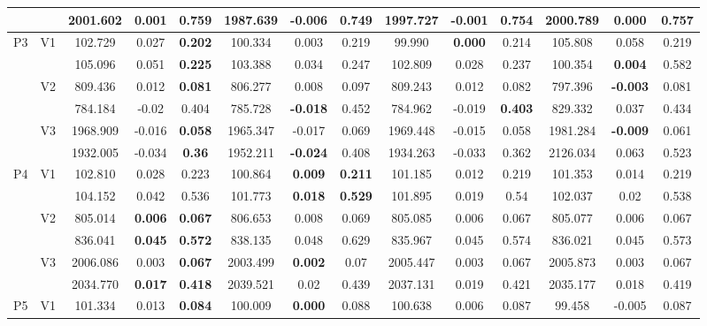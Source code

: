 \documentclass[12pt,a4paper]{article}
\begin{document}
\begin{sidewaystable}[ht]
{\begin{tabular}{cc|ccc|ccc|ccc|ccc|}
   &  & 2001.602 & 0.001 & 0.759 & 1987.639 & -0.006 & \textbf{0.749} & 1997.727 & -0.001 & 0.754 & 2000.789 & \textbf{0.000} & 0.757 \\ 
   \hline \hline\multirow{6}{*}{P3} & \multirow{2}{*}{V1} & 102.729 & 0.027 & \textbf{0.202} & 100.334 & 0.003 & 0.219 & 99.990 & \textbf{0.000} & 0.214 & 105.808 & 0.058 & 0.219 \\ 
   &  & 105.096 & 0.051 & \textbf{0.225} & 103.388 & 0.034 & 0.247 & 102.809 & 0.028 & 0.237 & 100.354 & \textbf{0.004} & 0.582 \\ 
   & \multirow{2}{*}{V2} & 809.436 & 0.012 & \textbf{0.081} & 806.277 & 0.008 & 0.097 & 809.243 & 0.012 & 0.082 & 797.396 & \textbf{-0.003} & 0.081 \\ 
   &  & 784.184 & -0.02 & 0.404 & 785.728 & \textbf{-0.018} & 0.452 & 784.962 & -0.019 & \textbf{0.403} & 829.332 & 0.037 & 0.434 \\ 
   & \multirow{2}{*}{V3} & 1968.909 & -0.016 & \textbf{0.058} & 1965.347 & -0.017 & 0.069 & 1969.448 & -0.015 & 0.058 & 1981.284 & \textbf{-0.009} & 0.061 \\ 
   &  & 1932.005 & -0.034 & \textbf{0.36} & 1952.211 & \textbf{-0.024} & 0.408 & 1934.263 & -0.033 & 0.362 & 2126.034 & 0.063 & 0.523 \\ 
   \hline \hline\multirow{6}{*}{P4} & \multirow{2}{*}{V1} & 102.810 & 0.028 & 0.223 & 100.864 & \textbf{0.009} & \textbf{0.211} & 101.185 & 0.012 & 0.219 & 101.353 & 0.014 & 0.219 \\ 
   &  & 104.152 & 0.042 & 0.536 & 101.773 & \textbf{0.018} & \textbf{0.529} & 101.895 & 0.019 & 0.54 & 102.037 & 0.02 & 0.538 \\ 
   & \multirow{2}{*}{V2} & 805.014 & \textbf{0.006} & \textbf{0.067} & 806.653 & 0.008 & 0.069 & 805.085 & 0.006 & 0.067 & 805.077 & 0.006 & 0.067 \\ 
   &  & 836.041 & \textbf{0.045} & \textbf{0.572} & 838.135 & 0.048 & 0.629 & 835.967 & 0.045 & 0.574 & 836.021 & 0.045 & 0.573 \\ 
   & \multirow{2}{*}{V3} & 2006.086 & 0.003 & \textbf{0.067} & 2003.499 & \textbf{0.002} & 0.07 & 2005.447 & 0.003 & 0.067 & 2005.873 & 0.003 & 0.067 \\ 
   &  & 2034.770 & \textbf{0.017} & \textbf{0.418} & 2039.521 & 0.02 & 0.439 & 2037.131 & 0.019 & 0.421 & 2035.177 & 0.018 & 0.419 \\ 
   \hline \hline\multirow{6}{*}{P5} & \multirow{2}{*}{V1} & 101.334 & 0.013 & \textbf{0.084} & 100.009 & \textbf{0.000} & 0.088 & 100.638 & 0.006 & 0.087 & 99.458 & -0.005 & 0.087 \\ 

\end{tabular}}
\end{sidewaystable}
\end{document}
